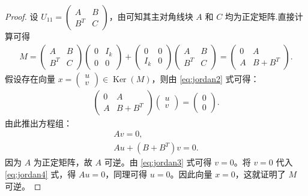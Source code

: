 \documentclass[../../main.tex]{subfiles}%
\begin{document}
\begin{proof}
设 \(U_{11} = \begin{pmatrix} A & B \\ B^T & C \end{pmatrix}\)，由可知其主对角线块 \(A\) 和 \(C\) 均为正定矩阵.直接计算可得
\begin{align}
M = \begin{pmatrix} A & B \\ B^T & C \end{pmatrix} \begin{pmatrix} 0 & I_k \\ 0 & 0 \end{pmatrix} + \begin{pmatrix} 0 & 0 \\ I_k & 0 \end{pmatrix} \begin{pmatrix} A & B \\ B^T & C \end{pmatrix} = \begin{pmatrix} 0 & A \\ A & B + B^T \end{pmatrix}. \label{eq:jordan2}
\end{align}
假设存在向量 \(x = \begin{pmatrix} u \\ v \end{pmatrix} \in \operatorname{Ker}(M)\)，则由 \eqref{eq:jordan2} 式可得：
\begin{align*}
\begin{pmatrix} 0 & A \\ A & B + B^T \end{pmatrix} \begin{pmatrix} u \\ v \end{pmatrix} = \begin{pmatrix} 0 \\ 0 \end{pmatrix}.
\end{align*}
由此推出方程组：
\begin{gather}
A v = 0, \label{eq:jordan3} \\
A u + (B + B^T) v = 0. \label{eq:jordan4}
\end{gather}
因为 \(A\) 为正定矩阵，故 \(A\) 可逆。由 \eqref{eq:jordan3} 式可得 \(v=0\)。将 \(v=0\) 代入 \eqref{eq:jordan4} 式，得 \(A u = 0\)，同理可得 \(u=0\)。因此向量 \(x=0\)，这就证明了 \(M\) 可逆。


\end{proof}
\end{document}
